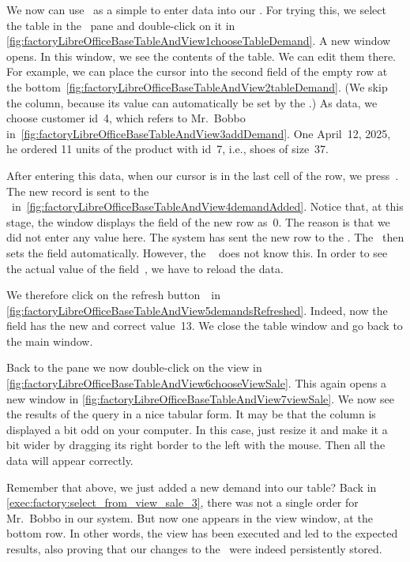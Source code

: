 %
We now can use \libreofficeBase\ as a simple  to enter data into our \db.
For trying this, we select the table  in the ~pane and double-click on it in \cref{fig:factoryLibreOfficeBaseTableAndView1chooseTableDemand}.
A new window opens.
In this window, we see the contents of the table.
We can edit them there.
For example, we can place the cursor into the second field of the empty row at the bottom~\cref{fig:factoryLibreOfficeBaseTableAndView2tableDemand}.
(We skip the  column, because its value can automatically be set by the \dbms.)
As data, we choose customer id~4, which refers to Mr.~Bobbo in~\cref{fig:factoryLibreOfficeBaseTableAndView3addDemand}.
One April~12, 2025, he ordered 11 units of the product with id~7, i.e., shoes of size~37.

After entering this data, when our cursor is in the last cell of the row, we press~\keys{\tab}.
The new record is sent to the \dbms\ in~\cref{fig:factoryLibreOfficeBaseTableAndView4demandAdded}.
Notice that, at this stage, the window displays the  field of the new row as~0.
The reason is that we did not enter any value here.
The system has sent the new row to the \dbms.
The \dbms\ then sets the  field automatically.
However, the \libreofficeBase\  does not know this.
In order to see the actual value of the field~, we have to reload the data.

We therefore click on the refresh button~\libreOfficeBaseRefresh\ in \cref{fig:factoryLibreOfficeBaseTableAndView5demandsRefreshed}.
Indeed, now the  field has the new and correct value~13.
We close the table window and go back to the main window.

Back to the  pane we now double-click on the view  in \cref{fig:factoryLibreOfficeBaseTableAndView6chooseViewSale}.
This again opens a new window in \cref{fig:factoryLibreOfficeBaseTableAndView7viewSale}.
We now see the results of the query in a nice tabular form.
It may be that the  column is displayed a bit odd on your computer.
In this case, just resize it and make it a bit wider by dragging its right border to the left with the mouse.
Then all the data will appear correctly.

Remember that above, we just added a new demand into our table?
Back in \cref{exec:factory:select_from_view_sale_3}, there was not a single order for Mr.~Bobbo in our system.
But now one appears in the view window, at the bottom row.
In other words, the view has been executed and led to the expected results, also proving that our changes to the \db\ were indeed persistently stored.%
%
\FloatBarrier%
\endhsection%
%
